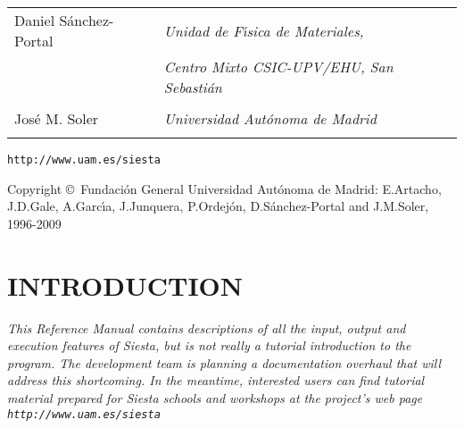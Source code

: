 \documentclass[11pt]{article}
\begin{document}
\begin{titlepage}
\begin{center}
{\begin{tabular}{ll}
{\Large Daniel S\'anchez-Portal} &
   \Large{\it Unidad de F\'{\i}sica de Materiales,} \\ 
                                 &
   \Large{\it Centro Mixto CSIC-UPV/EHU, San Sebasti\'an} \\ \\

{\Large Jos\'e M. Soler} &
   \Large{\it Universidad Aut\'onoma de Madrid} \\ \\

\end{tabular}
}

\vspace{0.5cm}
{\Large {\tt http://www.uam.es/siesta} }

\vspace{0.5cm}
Copyright \copyright\  Fundaci\'on General Universidad Aut\'onoma de Madrid:
E.Artacho, J.D.Gale, A.Garc\'{\i}a, J.Junquera, P.Ordej\'on,
D.S\'anchez-Portal and J.M.Soler, 1996-2009

\end{center}

\end{titlepage}


\tableofcontents

\newpage



\section{INTRODUCTION}

{\it This Reference Manual contains descriptions of all the input,
  output and execution features of {\sc Siesta}, but is not really a
  tutorial introduction to the program. The development team is
  planning a documentation overhaul that will address this
  shortcoming. In the meantime, interested users can find tutorial
  material prepared for {\sc Siesta} schools and workshops at the
  project's web page {\tt http://www.uam.es/siesta}}
\end{document}
